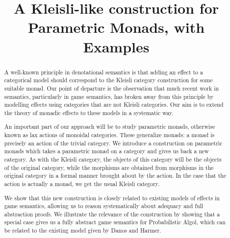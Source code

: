 \documentclass{svproc}
\begin{document}
\mainmatter              %
%
\title{A Kleisli-like construction for Parametric Monads, with Examples}
%
%
\author{}
%
\authorrunning{} %
%
\tocauthor{}
%

\maketitle              %

\begin{abstract}
  A well-known principle in denotational semantics is that adding an effect to a categorical model should correspond to the Kleisli category construction for some suitable monad.  
  Our point of departure is the observation that much recent work in semantics, particularly in game semantics, has broken away from this principle by modelling effects using categories that are not Kleisli categories.  
  Our aim is to extend the theory of monadic effects to these models in a systematic way.

  An important part of our approach will be to study parametric monads, otherwise known as lax actions of monoidal categories.
  These generalize monads: a monad is precisely an action of the trivial category.
  We introduce a construction on parametric monads which takes a parametric monad on a category and gives us back a new category.  
  As with the Kleisli category, the objects of this category will be the objects of the original category, while the morphisms are obtained from morphisms in the original category in a formal manner brought about by the action.  
  In the case that the action is actually a monad, we get the usual Kleisli category.

  We show that this new construction is closely related to existing models of effects in game semantics, allowing us to reason systematically about adequacy and full abstraction proofs.
  We illustrate the relevance of the construction by showing that a special case gives us a fully abstract game semantics for Probabilistic Algol, which can be related to the existing model given by Danos and Harmer.
\end{abstract}
\end{document}
